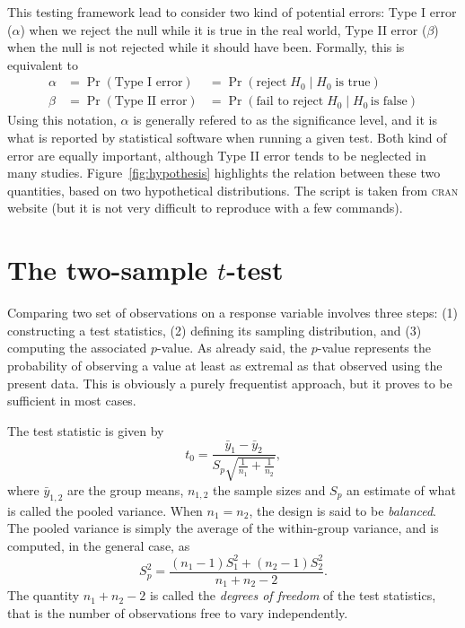 \documentclass[11pt,a4paper]{memoir}\usepackage[]{graphicx}\usepackage[]{color}
\begin{document}
This testing framework lead to consider two kind of potential errors:
Type I error ($\alpha$) when we reject the null while it is true in
the real world, Type II error ($\beta$) when the null is not rejected
while it should have been. Formally, this is equivalent to
\begin{equation}\label{eq:hyp2}
  \begin{array}{lll}
  \alpha &= \Pr(\textrm{Type I error}) &= \Pr(\textrm{reject}\; H_0\mid H_0\;\textrm{is
    true})\\
  \beta &= \Pr(\textrm{Type II error}) &= \Pr(\textrm{fail to
    reject}\;H_0\mid H_0\,\textrm{is false})
  \end{array}
\end{equation}
Using this notation, $\alpha$ is generally refered to as the
significance level, and it is what is reported by statistical software
when running a given test. Both kind of error are equally important,
although Type II error tends to be neglected in many
studies. Figure~\ref{fig:hypothesis} highlights the relation between
these two quantities, based on two hypothetical distributions. The
script is taken from \textsc{cran} website (but it is not very difficult to
reproduce with a few commands). 


\section{The two-sample $t$-test}
Comparing two set of observations on a response variable involves
three steps: (1) constructing a test statistics, (2) defining its
sampling distribution, and (3) computing the associated $p$-value. As
already said, the $p$-value represents the probability of observing a
value at least as extremal as that observed using the present
data. This is obviously a purely frequentist approach, but it proves
to be sufficient in most cases.

The test statistic is given by
\begin{equation}\label{eq:t-test}
  t_0=\frac{\bar{y}_1-\bar{y}_2}{S_p\sqrt{\frac{1}{n_1}+\frac{1}{n_2}}},
\end{equation}
where $\bar{y}_{1,2}$ are the group means, $n_{1,2}$ the sample sizes
and $S_p$ an estimate of what is called the pooled variance. When
$n_1=n_2$, the design is said to be \emph{balanced}. The pooled
variance is simply the average of the within-group variance, and is
computed, in the general case, as
\begin{equation}\label{eq:t-test2}
  S_p^2=\frac{(n_1-1)S_1^2+(n_2-1)S_2^2}{n_1+n_2-2}.
\end{equation}
The quantity $n_1+n_2-2$ is called the \emph{degrees of freedom} of the test
statistics, that is the number of observations free to vary
independently.
\end{document}
